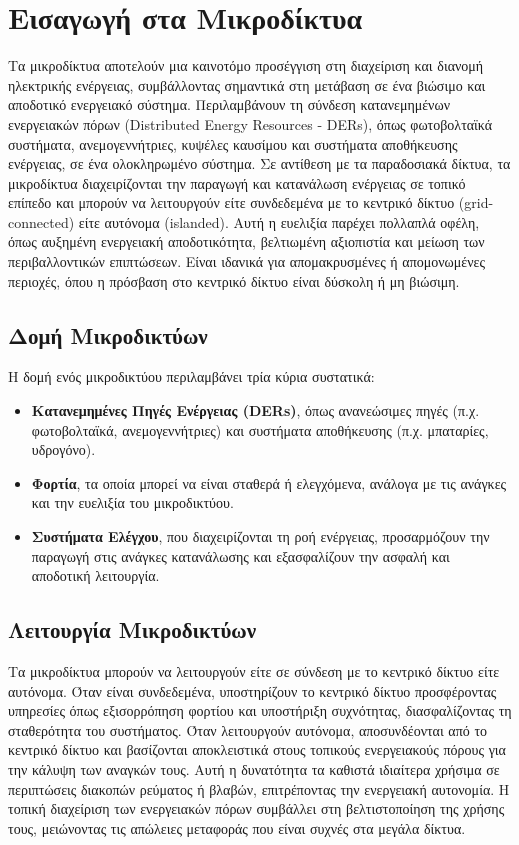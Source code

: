 \gr
\chapter{Εισαγωγή στα Μικροδίκτυα}
Τα μικροδίκτυα αποτελούν μια καινοτόμο προσέγγιση στη διαχείριση και διανομή ηλεκτρικής ενέργειας, συμβάλλοντας σημαντικά στη μετάβαση σε ένα βιώσιμο και αποδοτικό ενεργειακό σύστημα. Περιλαμβάνουν τη σύνδεση κατανεμημένων ενεργειακών πόρων (\en Distributed Energy Resources - DERs), \gr όπως φωτοβολταϊκά συστήματα, ανεμογεννήτριες, κυψέλες καυσίμου και συστήματα αποθήκευσης ενέργειας, σε ένα ολοκληρωμένο σύστημα. Σε αντίθεση με τα παραδοσιακά δίκτυα, τα μικροδίκτυα διαχειρίζονται την παραγωγή και κατανάλωση ενέργειας σε τοπικό επίπεδο και μπορούν να λειτουργούν είτε συνδεδεμένα με το κεντρικό δίκτυο (\en grid-connected) είτε αυτόνομα (\en islanded). Αυτή η ευελιξία παρέχει πολλαπλά οφέλη, όπως αυξημένη ενεργειακή αποδοτικότητα, βελτιωμένη αξιοπιστία και μείωση των περιβαλλοντικών επιπτώσεων. Είναι ιδανικά για απομακρυσμένες ή απομονωμένες περιοχές, όπου η πρόσβαση στο κεντρικό δίκτυο είναι δύσκολη ή μη βιώσιμη.

\section{Δομή Μικροδικτύων} 
Η δομή ενός μικροδικτύου περιλαμβάνει τρία κύρια συστατικά: \begin{itemize} 
    \item \textbf{Κατανεμημένες Πηγές Ενέργειας (\en DERs)}, όπως ανανεώσιμες πηγές (π.χ. φωτοβολταϊκά, ανεμογεννήτριες) και συστήματα αποθήκευσης (π.χ. μπαταρίες, υδρογόνο). 
    \\
    \item \textbf{Φορτία}, τα οποία μπορεί να είναι σταθερά ή ελεγχόμενα, ανάλογα με τις ανάγκες και την ευελιξία του μικροδικτύου. 
    \\
    \item \textbf{Συστήματα Ελέγχου}, που διαχειρίζονται τη ροή ενέργειας, προσαρμόζουν την παραγωγή στις ανάγκες κατανάλωσης και εξασφαλίζουν την ασφαλή και αποδοτική λειτουργία. 
\end{itemize}

\section{Λειτουργία Μικροδικτύων} 
Τα μικροδίκτυα μπορούν να λειτουργούν είτε σε σύνδεση με το κεντρικό δίκτυο είτε αυτόνομα. Όταν είναι συνδεδεμένα, υποστηρίζουν το κεντρικό δίκτυο προσφέροντας υπηρεσίες όπως εξισορρόπηση φορτίου και υποστήριξη συχνότητας, διασφαλίζοντας τη σταθερότητα του συστήματος. Όταν λειτουργούν αυτόνομα, αποσυνδέονται από το κεντρικό δίκτυο και βασίζονται αποκλειστικά στους τοπικούς ενεργειακούς πόρους για την κάλυψη των αναγκών τους. Αυτή η δυνατότητα τα καθιστά ιδιαίτερα χρήσιμα σε περιπτώσεις διακοπών ρεύματος ή βλαβών, επιτρέποντας την ενεργειακή αυτονομία. Η τοπική διαχείριση των ενεργειακών πόρων συμβάλλει στη βελτιστοποίηση της χρήσης τους, μειώνοντας τις απώλειες μεταφοράς που είναι συχνές στα μεγάλα δίκτυα.

